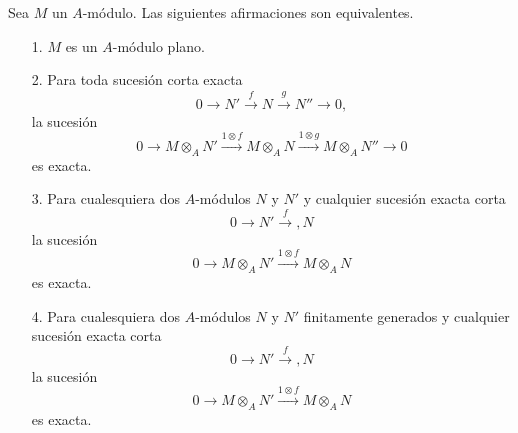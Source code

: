 \documentclass[../main.tex]{subfiles}
\begin{document}
\begin{proposition}
	Sea $M$ un $A$-módulo. Las siguientes afirmaciones son equivalentes.
	\begin{itemize}
		\item[1.] $M$ es un $A$-módulo plano.
		\item[2.] Para toda sucesión corta exacta $$0\longrightarrow N'\overset{f}{\longrightarrow}N\overset{g}{\longrightarrow}N''\longrightarrow 0,$$
		la sucesión $$0\longrightarrow M\otimes_A N'\overset{1\otimes f}{\longrightarrow}M\otimes_A N\overset{1\otimes g}{\longrightarrow}M\otimes_A N''\longrightarrow 0$$ es exacta.
		\item[3.] Para cualesquiera dos $A$-módulos $N$ y $N'$ y cualquier sucesión exacta corta $$0\longrightarrow N'\overset{f}{\longrightarrow},N$$ la sucesión $$0\longrightarrow M\otimes_A N'\overset{1\otimes f}{\longrightarrow}M\otimes_A N$$ es exacta.
		\item[4.] Para cualesquiera dos $A$-módulos $N$ y $N'$ finitamente generados y cualquier sucesión exacta corta $$0\longrightarrow N'\overset{f}{\longrightarrow},N$$ la sucesión $$0\longrightarrow M\otimes_A N'\overset{1\otimes f}{\longrightarrow}M\otimes_A N$$ es exacta.
	\end{itemize}
\end{proposition}
\end{document}
